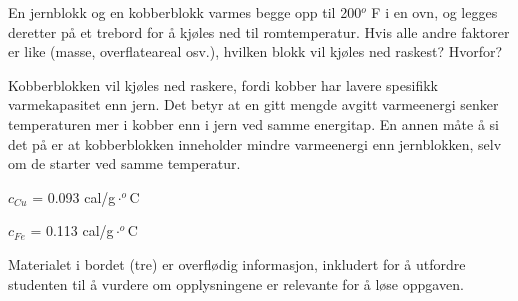 
En jernblokk og en kobberblokk varmes begge opp til 200$^{o}$ F i en ovn, og legges deretter på et trebord for å kjøles ned til romtemperatur. Hvis alle andre faktorer er like (masse, overflateareal osv.), hvilken blokk vil kjøles ned raskest? Hvorfor?







Kobberblokken vil kjøles ned raskere, fordi kobber har lavere spesifikk varmekapasitet enn jern. Det betyr at en gitt mengde avgitt varmeenergi senker temperaturen mer i kobber enn i jern ved samme energitap. En annen måte å si det på er at kobberblokken inneholder mindre varmeenergi enn jernblokken, selv om de starter ved samme temperatur.

\vskip 10pt

$c_{Cu}$ = 0.093 cal/g$\cdot ^{o}$C

\vskip 10pt

$c_{Fe}$ = 0.113 cal/g$\cdot ^{o}$C







Materialet i bordet (tre) er overflødig informasjon, inkludert for å utfordre studenten til å vurdere om opplysningene er relevante for å løse oppgaven.


